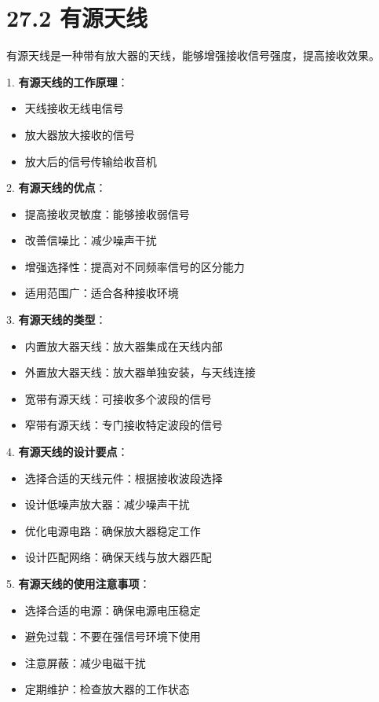 \documentclass[12pt,UTF8]{ctexbook}
\begin{document}
\section*{27.2 有源天线}

有源天线是一种带有放大器的天线，能够增强接收信号强度，提高接收效果。

1. \textbf{有源天线的工作原理}：
   \begin{itemize}[leftmargin=3.5em]
   \item 天线接收无线电信号
   \item 放大器放大接收的信号
   \item 放大后的信号传输给收音机
   \end{itemize}

2. \textbf{有源天线的优点}：
   \begin{itemize}[leftmargin=3.5em]
   \item 提高接收灵敏度：能够接收弱信号
   \item 改善信噪比：减少噪声干扰
   \item 增强选择性：提高对不同频率信号的区分能力
   \item 适用范围广：适合各种接收环境
   \end{itemize}

3. \textbf{有源天线的类型}：
   \begin{itemize}[leftmargin=3.5em]
   \item 内置放大器天线：放大器集成在天线内部
   \item 外置放大器天线：放大器单独安装，与天线连接
   \item 宽带有源天线：可接收多个波段的信号
   \item 窄带有源天线：专门接收特定波段的信号
   \end{itemize}

4. \textbf{有源天线的设计要点}：
   \begin{itemize}[leftmargin=3.5em]
   \item 选择合适的天线元件：根据接收波段选择
   \item 设计低噪声放大器：减少噪声干扰
   \item 优化电源电路：确保放大器稳定工作
   \item 设计匹配网络：确保天线与放大器匹配
   \end{itemize}

5. \textbf{有源天线的使用注意事项}：
   \begin{itemize}[leftmargin=3.5em]
   \item 选择合适的电源：确保电源电压稳定
   \item 避免过载：不要在强信号环境下使用
   \item 注意屏蔽：减少电磁干扰
   \item 定期维护：检查放大器的工作状态
   \end{itemize}
\end{document}
